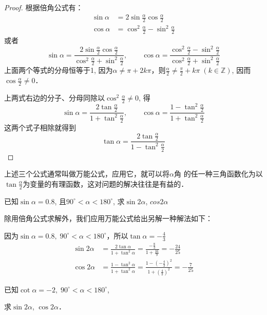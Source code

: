 \begin{proof}
根据倍角公式有：
\[\begin{split}
    \sin\alpha &=2\sin\frac{\alpha}{2}\cos\frac{\alpha}{2}\\
    \cos\alpha &=\cos^2\frac{\alpha}{2}-\sin^2\frac{\alpha}{2}
\end{split}\]
或者
\[\sin\alpha=\frac{2\sin\frac{\alpha}{2}\cos\frac{\alpha}{2}}{\cos^2\frac{\alpha}{2}+\sin^2\frac{\alpha}{2}},\qquad \cos\alpha=\frac{\cos^2\frac{\alpha}{2}-\sin^2\frac{\alpha}{2}}{\cos^2\frac{\alpha}{2}+\sin^2\frac{\alpha}{2}}\]
上面两个等式的分母恒等于1, 因为$\alpha\ne \pi+2k\pi$，则$\frac{\alpha}{2}\ne \frac{\pi}{2}+k\pi\; (k\in\mathbb{Z})$, 因而$\cos\frac{\alpha}{2}\ne 0$．

上两式右边的分子、分母同除以$\cos^2\frac{\alpha}{2}\ne 0$, 得
\[\sin\alpha =\frac{2\tan\frac{\alpha}{2}}{1+\tan^2\frac{\alpha}{2}},\qquad
\cos\alpha=\frac{1-\tan^2\frac{\alpha}{2}}{1+\tan^2\frac{\alpha}{2}}\]
这两个式子相除就得到
\[\tan\alpha=\frac{2\tan\frac{\alpha}{2}}{1-\tan^2\frac{\alpha}{2}}\]
\end{proof}

上述三个公式通常叫做万能公式，应用它，就可以将$\alpha$角
的任一种三角函数化为以$\tan\frac{\alpha}{2}$为变量的有理函数，这对问题的解决往往是有益的．

\begin{example}
已知$\sin\alpha=0.8$, 且$90^{\circ}<\alpha<180^{\circ}$,
求$\sin2\alpha$, $cos2\alpha$

\end{example}

\begin{solution}
   除用倍角公式求解外，我们应用万能公式给出另解一种解法如下： 

因为$\sin\alpha=0.8,\; 90^{\circ}<\alpha<180^{\circ}$，所以$\tan\alpha=-\frac{4}{3}$
\[\begin{split}
    \sin2\alpha&=\frac{2\tan\alpha}{1+\tan^2\alpha}=\frac{-\frac{8}{3}}{1+\frac{16}{9}}=-\frac{24}{25} \\
    \cos2\alpha&=\frac{1-\tan^2\alpha}{1+\tan^2\alpha}=\frac{1-\left(-\frac{4}{3}\right)^2}{1+\left(\frac{4}{3}\right)^2}=-\frac{7}{25}
\end{split}  \]
\end{solution}


\begin{example}
已知$\cot\alpha=-2,\; 90^{\circ}<\alpha<180^{\circ}$, 

求$\sin2\alpha$, $\cos2\alpha$．
\end{example}

